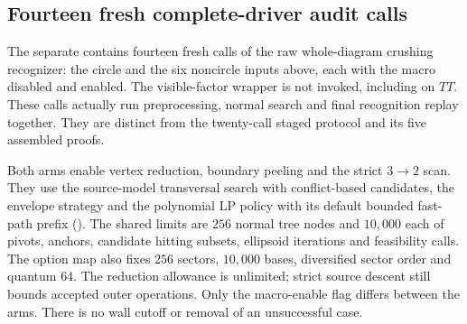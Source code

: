 \subsection{Fourteen fresh complete-driver audit calls}
\label{sec:pachner-descent-crushing-audit}

The separate  contains fourteen
fresh calls of the raw whole-diagram crushing recognizer: the circle
and the six noncircle inputs above, each with the macro disabled and
enabled.  The visible-factor wrapper is not invoked, including on $TT$.
These calls actually run preprocessing, normal search and final
recognition replay together.  They are distinct from the twenty-call
staged protocol and its five assembled proofs.

Both arms enable vertex reduction, boundary peeling and the strict
$3\to2$ scan.  They use the source-model transversal search with
conflict-based candidates, the envelope strategy and the polynomial
LP policy with its default bounded fast-path prefix
().  The shared limits
are $256$ normal tree nodes and $10{,}000$ each of pivots, anchors,
candidate hitting subsets, ellipsoid iterations and feasibility calls.
The option map also fixes $256$ sectors, $10{,}000$ bases, diversified
sector order and quantum $64$.  The reduction allowance is unlimited;
strict source descent still bounds accepted outer operations.  Only
the macro-enable flag differs between the arms.  There is no wall
cutoff or removal of an unsuccessful case.

